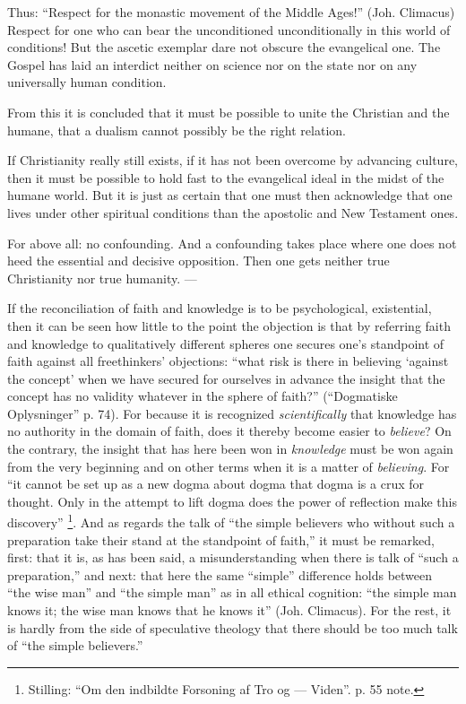 \documentclass[12pt,a4paper]{book}
\newcommand{\opage}[1]{\marginnote{\footnotesize\textit{[#1]}}}
\begin{document}
Thus: ``Respect for the monastic movement of the Middle Ages!''
(Joh. Climacus) Respect for one who can bear the unconditioned
unconditionally in this world of conditions! But the ascetic
exemplar dare not obscure the evangelical one. The Gospel has
laid an interdict neither on science nor on the state nor on any
universally human condition.

From this it is concluded that it must be possible to unite the
Christian and the humane, that a dualism cannot possibly be
the right relation.

If Christianity really still exists, if it has not been
overcome by advancing culture, then it must be possible
to hold fast to the evangelical ideal in the midst of the humane world.
But it is just as certain that one must then acknowledge that one
lives under other spiritual conditions than the apostolic and New Testament ones.

For above all: no confounding. And a
confounding takes place where one does not heed the
essential and decisive opposition. Then one gets neither
true Christianity nor true humanity. ---

If the reconciliation of faith and knowledge is to be psychological,
existential, then it can be seen how little to the point the objection is that
\opage{44}\setcounter{footnote}{0}%
by referring faith and knowledge to qualitatively different
spheres one secures one's standpoint of faith against all freethinkers'
objections: ``what risk is there in believing `against the concept'
when we have secured for ourselves in advance the insight that the concept has
no validity whatever in the sphere of faith?'' (``Dogmatiske
Oplysninger'' p. 74). For because it is recognized \emph{scientifically}
that knowledge has no authority in the domain of faith, does
it thereby become easier to \emph{believe}? On the contrary, the insight that
has here been won in \emph{knowledge} must be won again from the very beginning and on other terms
when it is a matter of \emph{believing}. For ``it cannot be
set up as a new dogma about dogma that dogma is a
crux for thought. Only in the attempt to lift dogma does
the power of reflection make this discovery''%
\footnote{Stilling: ``Om den indbildte Forsoning af Tro og --- Viden''.
p. 55 note.}. And as regards
the talk of ``the simple believers who without such a
preparation take their stand at the standpoint of faith,'' it must be remarked,
first: that it is, as has been said, a misunderstanding when
there is talk of ``such a preparation,'' and next: that here
the same ``simple'' difference holds between ``the wise man''
and ``the simple man'' as in all ethical cognition: ``the simple man
knows it; the wise man knows that he knows it'' (Joh.
Climacus). For the rest, it is hardly from the side of speculative
theology that there should be too much talk of ``the simple
believers.''
\end{document}
